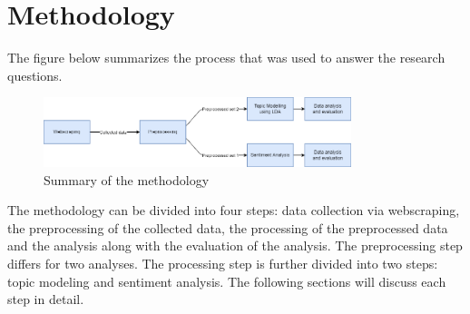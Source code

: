 \section{Methodology}


The figure below summarizes the process that was used to answer the research questions.

\begin{figure}[h]
    \centering
    \includegraphics[width=0.8\textwidth]{resources/methodology.png}
    \caption{Summary of the methodology}
    \label{fig:methodology}
\end{figure}

The methodology can be divided into four steps: data collection via webscraping, the preprocessing of the collected data, the processing of the preprocessed data and the analysis along with the evaluation of the analysis. The preprocessing step differs for two analyses. The processing step is further divided into two steps: topic modeling and sentiment analysis. The following sections will discuss each step in detail.